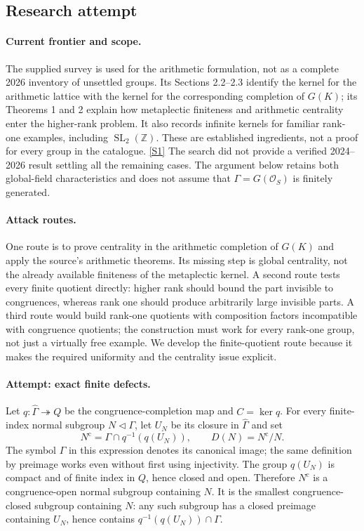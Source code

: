 \documentclass[11pt,a4paper]{article}
\newcommand{\Z}{\mathbb{Z}}
\newcommand{\sref}[2]{\hyperlink{source:#1:#2}{[S#2]}}
\numberwithin{equation}{section}
\begin{document}
\subsection{Research attempt}

\paragraph{Current frontier and scope.}
The supplied survey is used for the arithmetic formulation, not as a
complete 2026 inventory of unsettled groups.  Its Sections 2.2--2.3 identify
the kernel for the arithmetic lattice with the kernel for the corresponding
completion of $G(K)$; its Theorems 1 and 2 explain how metaplectic finiteness
and arithmetic centrality enter the higher-rank problem.  It also records
infinite kernels for familiar rank-one examples, including
$\operatorname{SL}_2(\Z)$.  These are established ingredients, not a proof
for every group in the catalogue. \sref{statement}{1}
The search did not provide a verified 2024--2026 result settling all the
remaining cases.  The argument below retains both global-field
characteristics and does not assume that $\Gamma=G(\mathcal O_S)$ is
finitely generated.

\paragraph{Attack routes.}
One route is to prove centrality in the arithmetic completion of $G(K)$
and apply the source's arithmetic theorems.  Its missing step is global
centrality, not the already available finiteness of the metaplectic
kernel.  A second route tests every finite quotient directly: higher rank
should bound the part invisible to congruences, whereas rank one should
produce arbitrarily large invisible parts.  A third route would build
rank-one quotients with composition factors incompatible with congruence
quotients; the construction must work for every rank-one group, not just
a virtually free example.  We develop the finite-quotient route because
it makes the required uniformity and the centrality issue explicit.

\paragraph{Attempt: exact finite defects.}
Let $q:\widehat\Gamma\twoheadrightarrow Q$ be the congruence-completion
map and $C=\ker q$.  For every finite-index normal subgroup
$N\triangleleft\Gamma$, let $U_N$ be its closure in $\widehat\Gamma$ and
set
\[
 N^{\mathrm c}=\Gamma\cap q^{-1}(q(U_N)),\qquad
 D(N)=N^{\mathrm c}/N.
\]
The symbol $\Gamma$ in this expression denotes its canonical image; the
same definition by preimage works even without first using injectivity.
The group $q(U_N)$ is compact and of finite index in $Q$, hence closed
and open.  Therefore $N^{\mathrm c}$ is a congruence-open normal subgroup
containing $N$.  It is the smallest congruence-closed subgroup containing
$N$: any such subgroup has a closed preimage containing $U_N$, hence
contains $q^{-1}(q(U_N))\cap\Gamma$.
\end{document}
